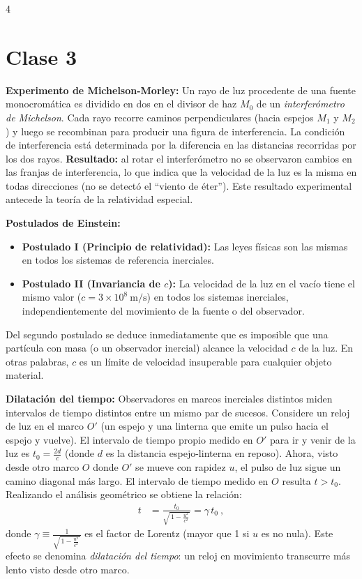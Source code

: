 \documentclass[landscape,10pt]{article}
\begin{document}
\small                                %
\begin{multicols}{4}

\section*{Clase 3}

\noindent \textbf{Experimento de Michelson-Morley:} Un rayo de luz procedente de una fuente monocromática es dividido en dos en el divisor de haz $M_0$ de un \emph{interferómetro de Michelson}. Cada rayo recorre caminos perpendiculares (hacia espejos $M_1$ y $M_2$) y luego se recombinan para producir una figura de interferencia. La condición de interferencia está determinada por la diferencia en las distancias recorridas por los dos rayos. \textbf{Resultado:} al rotar el interferómetro no se observaron cambios en las franjas de interferencia, lo que indica que la velocidad de la luz es la misma en todas direcciones (no se detectó el “viento de éter”). Este resultado experimental antecede la teoría de la relatividad especial.

\medskip \noindent \textbf{Postulados de Einstein:}
\begin{itemize}\setlength\itemsep{0pt}
  \item \textbf{Postulado I (Principio de relatividad):} Las leyes físicas son las mismas en todos los sistemas de referencia inerciales.
  \item \textbf{Postulado II (Invariancia de $c$):} La velocidad de la luz en el vacío tiene el mismo valor ($c = 3\times 10^8~\text{m/s}$) en todos los sistemas inerciales, independientemente del movimiento de la fuente o del observador.
\end{itemize}

Del segundo postulado se deduce inmediatamente que es imposible que una partícula con masa (o un observador inercial) alcance la velocidad $c$ de la luz. En otras palabras, $c$ es un límite de velocidad insuperable para cualquier objeto material.

\medskip \noindent \textbf{Dilatación del tiempo:} Observadores en marcos inerciales distintos miden intervalos de tiempo distintos entre un mismo par de sucesos. Considere un reloj de luz en el marco $O'$ (un espejo y una linterna que emite un pulso hacia el espejo y vuelve). El intervalo de tiempo propio medido en $O'$ para ir y venir de la luz es $t_0 = \frac{2d}{c}$ (donde $d$ es la distancia espejo-linterna en reposo). Ahora, visto desde otro marco $O$ donde $O'$ se mueve con rapidez $u$, el pulso de luz sigue un camino diagonal más largo. El intervalo de tiempo medido en $O$ resulta $t > t_0$. Realizando el análisis geométrico se obtiene la relación:
\begin{align*}
t &= \frac{t_0}{\sqrt{\,1 - \frac{u^2}{c^2}\,}} = \gamma\, t_0~,
\end{align*}
donde $\displaystyle \gamma \equiv \frac{1}{\sqrt{\,1 - \frac{u^2}{c^2}\,}}$ es el factor de Lorentz (mayor que 1 si $u$ es no nula). Este efecto se denomina \emph{dilatación del tiempo}: un reloj en movimiento transcurre más lento visto desde otro marco. 


\end{multicols}
\end{document}
